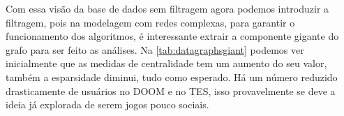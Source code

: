 \documentclass[12pt]{article}
\begin{document}

Com essa visão da base de dados sem filtragem agora podemos introduzir a filtragem, pois na modelagem com redes complexas, para garantir o funcionamento dos algoritmos, é interessante extrair a componente gigante do grafo para ser feito as análises. Na \ref{tab:datagraphsgiant} podemos ver inicialmente que as medidas de centralidade tem um aumento do seu valor, também a esparsidade diminui, tudo como esperado. Há um número reduzido drasticamente de usuários no DOOM e no TES, isso provavelmente se deve a ideia já explorada de serem jogos pouco sociais.
\end{document}
